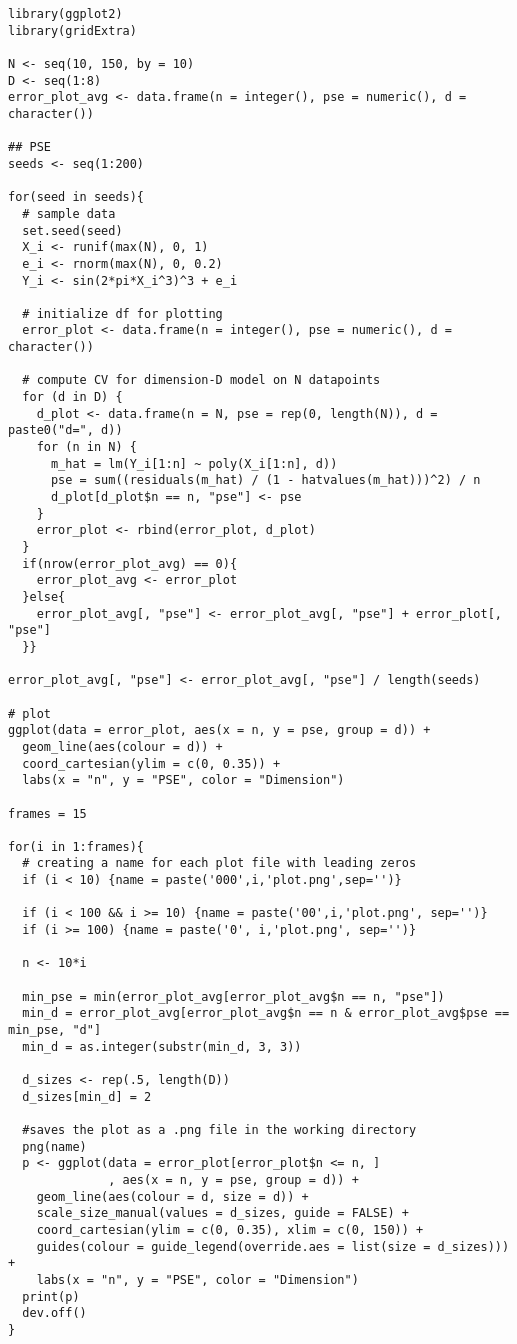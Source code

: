 \begin{lstlisting}
library(ggplot2)
library(gridExtra)

N <- seq(10, 150, by = 10)
D <- seq(1:8)
error_plot_avg <- data.frame(n = integer(), pse = numeric(), d = character())

## PSE
seeds <- seq(1:200)

for(seed in seeds){
  # sample data
  set.seed(seed)
  X_i <- runif(max(N), 0, 1)
  e_i <- rnorm(max(N), 0, 0.2)
  Y_i <- sin(2*pi*X_i^3)^3 + e_i
  
  # initialize df for plotting
  error_plot <- data.frame(n = integer(), pse = numeric(), d = character())
  
  # compute CV for dimension-D model on N datapoints
  for (d in D) {
    d_plot <- data.frame(n = N, pse = rep(0, length(N)), d = paste0("d=", d))
    for (n in N) {
      m_hat = lm(Y_i[1:n] ~ poly(X_i[1:n], d))
      pse = sum((residuals(m_hat) / (1 - hatvalues(m_hat)))^2) / n
      d_plot[d_plot$n == n, "pse"] <- pse
    }
    error_plot <- rbind(error_plot, d_plot)
  }
  if(nrow(error_plot_avg) == 0){
    error_plot_avg <- error_plot
  }else{
    error_plot_avg[, "pse"] <- error_plot_avg[, "pse"] + error_plot[, "pse"] 
  }}

error_plot_avg[, "pse"] <- error_plot_avg[, "pse"] / length(seeds)

# plot
ggplot(data = error_plot, aes(x = n, y = pse, group = d)) + 
  geom_line(aes(colour = d)) +
  coord_cartesian(ylim = c(0, 0.35)) +
  labs(x = "n", y = "PSE", color = "Dimension")

frames = 15

for(i in 1:frames){
  # creating a name for each plot file with leading zeros
  if (i < 10) {name = paste('000',i,'plot.png',sep='')}
  
  if (i < 100 && i >= 10) {name = paste('00',i,'plot.png', sep='')}
  if (i >= 100) {name = paste('0', i,'plot.png', sep='')}
  
  n <- 10*i
  
  min_pse = min(error_plot_avg[error_plot_avg$n == n, "pse"])
  min_d = error_plot_avg[error_plot_avg$n == n & error_plot_avg$pse == min_pse, "d"]
  min_d = as.integer(substr(min_d, 3, 3))
  
  d_sizes <- rep(.5, length(D))
  d_sizes[min_d] = 2
  
  #saves the plot as a .png file in the working directory
  png(name)
  p <- ggplot(data = error_plot[error_plot$n <= n, ]
              , aes(x = n, y = pse, group = d)) + 
    geom_line(aes(colour = d, size = d)) +
    scale_size_manual(values = d_sizes, guide = FALSE) +
    coord_cartesian(ylim = c(0, 0.35), xlim = c(0, 150)) +
    guides(colour = guide_legend(override.aes = list(size = d_sizes))) + 
    labs(x = "n", y = "PSE", color = "Dimension")
  print(p)
  dev.off()
}


\end{lstlisting}
